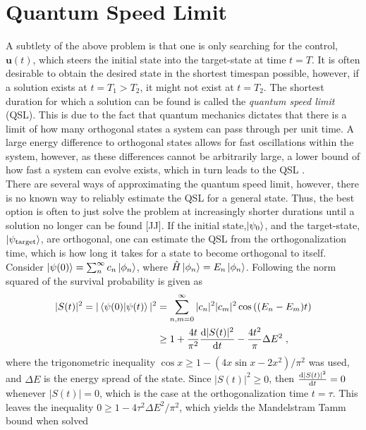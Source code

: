\section{Quantum Speed Limit}
A subtlety of the above problem is that one is only searching for the control, $\boldsymbol{u}(t)$, which steers the initial state into the target-state at time $t = T$. It is often desirable to obtain the desired state in the shortest timespan possible, however, if a solution exists at $t= T_1 > T_2$, it might not exist at $t = T_2$. The shortest duration for which a solution can be found is called the \textit{quantum speed limit} (QSL). This is due to the fact that quantum mechanics dictates that there is a limit of how many orthogonal states a system can pass through per unit time. A large energy difference to orthogonal states allows for fast oscillations within the system, however, as these differences cannot be arbitrarily large, a lower bound of how fast a system can evolve exists, which in turn leads to the QSL \cite{Caneva2009}.\\
There are several ways of approximating the quantum speed limit, however, there is no known way to reliably estimate the QSL for a general state. Thus, the best option is often to just solve the problem at increasingly shorter durations until a solution no longer can be found [JJ]. 
If the initial state,$\ket{\psi_0}$, and the target-state, $\ket{\psi_{\mathrm{target}}}$, are orthogonal, one can estimate the QSL from the orthogonalization time, which is how long it takes for a state to become orthogonal to itself.
Consider $\ket{\psi (0)} = \sum_{n}^{\infty} c_n \ket{\phi _n}$, where $\hat{H} \ket{\phi _n} = E_n \ket{\phi _n}$. Following \cite{QSLtoffoli} the norm squared of the survival probability is given as
\begin{align}
	|S(t)|^2 = |\braket{\psi (0) | \psi (t)}|^2 &= \sum_{n , m = 0}^{\infty} |c_n|^2 |c_m|^2 \cos \left( (E_n - E_m) t \right) \nonumber \\
	&\geq 1 + \frac{4 t}{\pi ^2} \dv{|S(t)|^2}{t} - \frac{4 t^2}{\pi} \Delta E^2 \; ,
\end{align}
where the trigonometric inequality $\cos x \geq 1 - \left( 4 x \sin x - 2 x^2 \right) / \pi^2$ was used, and $\Delta E$ is the energy spread of the state.
Since $|S(t)|^2 \geq 0$, then $\dv{|S(t)|^2}{t} = 0$ whenever $|S(t)| = 0$, which is the case at the orthogonalization time $t = \tau$. This leaves the inequality $0 \geq 1 - 4 \tau^2 \Delta E^2 / \pi^2$, which yields the Mandelstram Tamm bound when solved \cite{Mandelstam1991}
